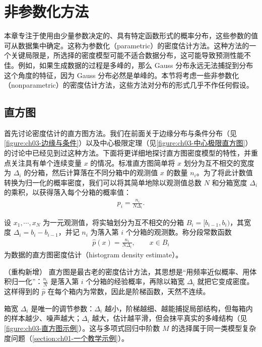 \documentclass[../../main.tex]{subfiles}
\begin{document}
\section{非参数化方法}\label{section:ch03-非参数化方法}

本章专注于使用由少量参数决定的、具有特定函数形式的概率分布，这些参数的值可从数据集中确定。这称为参数化（parametric）的密度估计方法。这种方法的一个关键局限是，所选择的密度模型可能不适合数据分布，这可能导致预测性能不佳。例如，如果生成数据的过程是多峰的，那么 Gauss 分布永远无法捕捉到分布这个角度的特征，因为 Gauss 分布必然是单峰的。本节将考虑一些非参数化（nonparametric）的密度估计方法，这些方法对分布的形式几乎不作任何假设。

\subsection{直方图}\label{subsection:ch03-直方图}

首先讨论密度估计的直方图方法。我们在前面关于边缘分布与条件分布（见\cref{figure:ch03-边缘与条件}）以及中心极限定理（见\cref{figure:ch03-中心极限直方图}）的讨论中已经见到过这种方法。下面将更详细地探讨直方图密度模型的特性，并重点关注具有单个连续变量 $x$ 的情况。标准直方图简单将 $x$ 划分为互不相交的宽度为 $\Delta_i$ 的分箱，然后计算落在不同分箱中的观测值 $x$ 的数量 $n_i$。为了将此计数值转换为归一化的概率密度，我们可以将其简单地除以观测值总数 $N$ 和分箱宽度 $\Delta_i$ 的乘积，以获得落入每个分箱的概率值：
\begin{align}
p_i=\frac{n_i}{N\Delta_i}.
\label{align:ch03-直方图密度}
\end{align}

\begin{definition}[直方图密度估计]\label{definition:ch03-直方图}
设 $x_1,\cdots,x_N$ 为一元观测值，将实轴划分为互不相交的分箱 $B_i=[b_{i-1},b_i)$，其宽度 $\Delta_i=b_i-b_{i-1}$，并记 $n_i$ 为落入第 $i$ 个分箱的观测数。称分段常数函数
\begin{align*}
\hat{p}(x)=\frac{n_i}{N\Delta_i},\qquad x\in B_i
\end{align*}
为数据的直方图密度估计（histogram density estimate）。
\end{definition}

\begin{remark}（重构新增）
直方图是最古老的密度估计方法，其思想是“用频率近似概率、用体积归一化”：$\frac{n_i}{N}$ 是落入第 $i$ 个分箱的经验概率，再除以箱宽 $\Delta_i$ 就把它变成密度。这样得到的 $\hat{p}$ 在每个箱内为常数，因此是阶梯函数，天然不连续。

箱宽 $\Delta_i$ 是唯一的调节参数：$\Delta_i$ 越小，阶梯越细、越能捕捉局部结构，但每箱内的样本越少、噪声越大；$\Delta_i$ 越大，估计越平滑，但会抹平真实的多峰结构（见\cref{figure:ch03-直方图示例}）。这与多项式回归中阶数 $M$ 的选择属于同一类模型复杂度问题（\cref{section:ch01-一个教学示例}）。
\end{remark}
\end{document}
